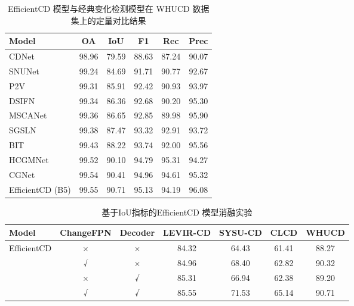 \begin{table}[!htb]
  \centering
  \caption{EfficientCD 模型与经典变化检测模型在 WHUCD 数据集上的定量对比结果}
  \label{tab:efficientcd_whucd}
  \begin{tabular}{lccccc}
    \toprule
    Model            &   OA   &  IoU   &   F1   &   Rec   &  Prec   \\
    \midrule
    CDNet~\cite{Alcantarilla2016StreetviewCD}            &  98.96 &  79.59 &  88.63 &  87.24  &  90.07  \\
    SNUNet~\cite{Fang2021SNUNetCDAD}           &  99.24 &  84.69 &  91.71 &  90.77  &  92.67  \\
    P2V~\cite{lin_transition_2023}              &  99.31 &  85.91 &  92.42 &  90.93  &  93.97  \\
    DSIFN~\cite{Zhang2020ADS}            &  99.34 &  86.36 &  92.68 &  90.20  &  95.30  \\
    MSCANet~\cite{m_liu_cnn-transformer_2022}          &  99.36 &  86.65 &  92.85 &  89.98  &  95.90  \\
    SGSLN~\cite{zhao_exchanging_2023}            &  99.38 &  87.47 &  93.32 &  92.91  &  93.72  \\
    BIT~\cite{chen_remote_2022}              &  99.43 &  88.22 &  93.74 &  92.00  &  95.56  \\
    HCGMNet~\cite{Han2023HCGMNetAH}          &  99.52 &  90.10 &  94.79 &  95.31  &  94.27  \\
    CGNet~\cite{han_change_2023}            &  99.54 &  90.41 &  94.96 &  94.61  &  95.32  \\
    EfficientCD (B5) &  99.55 &  90.71 &  95.13 &  94.19  &  96.08  \\
    \bottomrule
  \end{tabular}
\end{table}

\begin{table}[!htb]
  \centering
  \setlength{\tabcolsep}{3pt} %
  \caption{基于IoU指标的EfficientCD 模型消融实验}
  \label{tab:efficientcd_ablation}
  \begin{tabular}{lcccccc}
    \toprule
    Model         & ChangeFPN & Decoder & LEVIR-CD & SYSU-CD & CLCD   & WHUCD  \\
    \midrule
    \multirow{4}{*}{EfficientCD} 
                  & ×         & ×       & 84.32    & 64.43   & 61.41  & 88.27  \\
                  & √         & ×       & 84.96    & 68.40   & 62.82  & 90.32  \\
                  & ×         & √       & 85.31    & 66.94   & 62.38  & 89.20  \\
                  & √         & √       & 85.55    & 71.53   & 65.14  & 90.71  \\
    \bottomrule
  \end{tabular}
\end{table}


